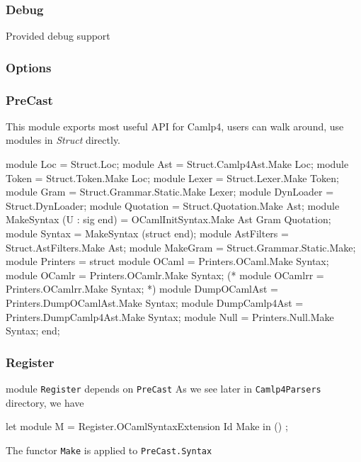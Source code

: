 \subsubsection{Debug}
\label{sec:debug}

Provided debug support  

\subsubsection{Options}
\label{sec:options}

\subsubsection{PreCast}
\label{sec:precast}
This module exports most useful API for Camlp4, users can walk around,
use modules in \textit{Struct} directly.

\begin{ocamlcode}
module Loc = Struct.Loc;
module Ast = Struct.Camlp4Ast.Make Loc;
module Token = Struct.Token.Make Loc;
module Lexer = Struct.Lexer.Make Token;
module Gram = Struct.Grammar.Static.Make Lexer;
module DynLoader = Struct.DynLoader;
module Quotation = Struct.Quotation.Make Ast;
module MakeSyntax (U : sig end) = OCamlInitSyntax.Make Ast Gram Quotation;
module Syntax = MakeSyntax (struct end);
module AstFilters = Struct.AstFilters.Make Ast;
module MakeGram = Struct.Grammar.Static.Make;
module Printers = struct
  module OCaml = Printers.OCaml.Make Syntax;
  module OCamlr = Printers.OCamlr.Make Syntax;
  (* module OCamlrr = Printers.OCamlrr.Make Syntax; *)
  module DumpOCamlAst = Printers.DumpOCamlAst.Make Syntax;
  module DumpCamlp4Ast = Printers.DumpCamlp4Ast.Make Syntax;
  module Null = Printers.Null.Make Syntax;
end;
\end{ocamlcode}

\subsubsection{Register}
\label{sec:register}
module \verb|Register| depends on \verb|PreCast|
As we see later in \verb|Camlp4Parsers| directory, we have

\begin{ocamlcode}
let module M = Register.OCamlSyntaxExtension Id Make in ()  ;
\end{ocamlcode}
The functor \verb|Make| is applied to \verb|PreCast.Syntax|

